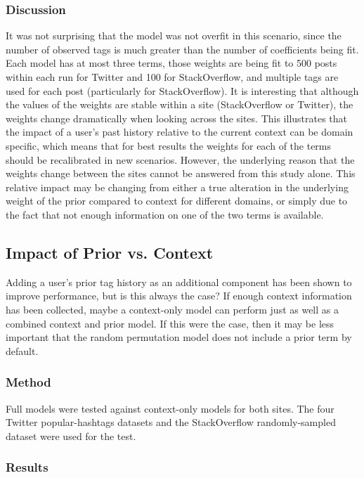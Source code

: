 \documentclass[man,floatsintext,donotrepeattitle]{apa6}
\begin{document}
\subsubsection{Discussion}

It was not surprising that the model was not overfit in this scenario, since the number of observed tags is much greater than the number of coefficients being fit.
Each model has at most three terms, those weights are being fit to 500 posts within each run for Twitter and 100 for StackOverflow, and multiple tags are used for each post (particularly for StackOverflow).
It is interesting that although the values of the weights are stable within a site (StackOverflow or Twitter), the weights change dramatically when looking across the sites.
This illustrates that the impact of a user's past history relative to the current context can be domain specific, which means that for best results the weights for each of the terms should be recalibrated in new scenarios.
However, the underlying reason that the weights change between the sites cannot be answered from this study alone.
This relative impact may be changing from either a true alteration in the underlying weight of the prior compared to context for different domains,
or simply due to the fact that not enough information on one of the two terms is available.

\subsection{Impact of Prior vs. Context}

Adding a user's prior tag history as an additional component has been shown to improve performance, but is this always the case?
If enough context information has been collected, maybe a context-only model can perform just as well as a combined context and prior model.
If this were the case, then it may be less important that the random permutation model does not include a prior term by default.

\subsubsection{Method}

Full models were tested against context-only models for both sites. 
The four Twitter popular-hashtags datasets and the StackOverflow randomly-sampled dataset were used for the test. 

\subsubsection{Results}
\end{document}
